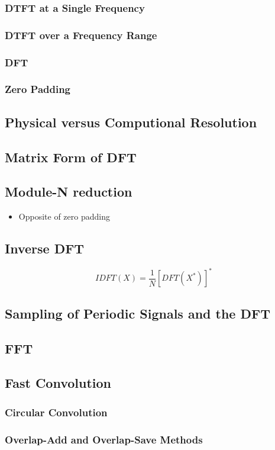 \subsubsection{DTFT at a Single Frequency}
\subsubsection{DTFT over a Frequency Range}
\subsubsection{DFT}
\subsubsection{Zero Padding}

\subsection{Physical versus Computional Resolution}

\subsection{Matrix Form of DFT}

\subsection{Module-N reduction}
\begin{itemize}
	\item Opposite of zero padding
\end{itemize}


\subsection{Inverse DFT}
\begin{equation}
	IDFT(X) = \frac{1}{N}\left[DFT(X^*)\right]^*
	\label{eq:IDFT}
\end{equation}

\subsection{Sampling of Periodic Signals and the DFT}

\subsection{FFT}

\subsection{Fast Convolution}
\subsubsection{Circular Convolution}
\subsubsection{Overlap-Add and Overlap-Save Methods}


